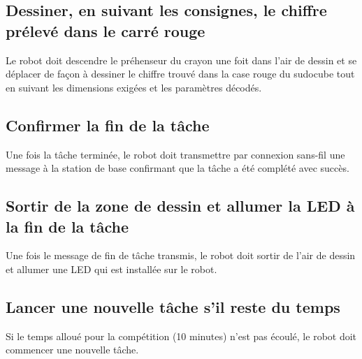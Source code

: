 \subsection{Dessiner, en suivant les consignes, le chiffre prélevé dans le carré rouge}
Le robot doit descendre le préhenseur du crayon une foit dans l'air de dessin et se déplacer de façon à dessiner le chiffre trouvé dans la case rouge du sudocube tout en suivant les dimensions exigées et les paramètres décodés.
\subsection{Confirmer la fin de la tâche}
Une fois la tâche terminée, le robot doit transmettre par connexion sans-fil une message à la station de base confirmant que la tâche a été complété avec succès.
\subsection{Sortir de la zone de dessin et allumer la LED à la fin de la tâche}
Une fois le message de fin de tâche transmis, le robot doit sortir de l'air de dessin et allumer une LED qui est installée sur le robot.
\subsection{Lancer une nouvelle tâche s'il reste du temps}
Si le temps alloué pour la compétition (10 minutes) n'est pas écoulé, le robot doit commencer une nouvelle tâche.